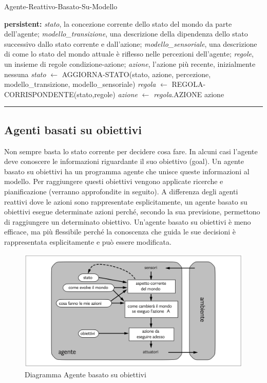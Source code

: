 \documentclass{article}
\begin{document}
\begin{center}
\begin{algorithm}
\caption{Agente-Reattivo-Basato-Su-Modello }
\textbf{persistent: }\textit{stato}, la concezione corrente dello stato del mondo da parte dell'agente;\newline
\textit{modello\_transizione}, una descrizione della dipendenza dello stato successivo dallo stato corrente e dall'azione;\newline
\textit{modello\_sensoriale}, una descrizione di come lo stato del mondo attuale è riflesso nelle percezioni dell'agente;\newline
\textit{regole}, un insieme di regole condizione-azione;\newline
\textit{azione}, l'azione più recente, inizialmente nessuna\;
\textit{stato} $\leftarrow$ AGGIORNA-STATO(stato, azione, percezione, modello\_transizione, modello\_sensoriale)\;
\textit{regola} $\leftarrow$ REGOLA-CORRISPONDENTE(stato,regole)\;
\textit{azione} $\leftarrow$ \textit{regola}.AZIONE\;
\Return azione
\end{algorithm}
\end{center}
\par\noindent\rule{\textwidth}{0.4pt}
\newpage
\subsection{Agenti basati su obiettivi}
Non sempre basta lo stato corrente per decidere cosa fare. In alcuni casi l'agente deve conoscere le informazioni riguardante il suo obiettivo (goal). Un agente basato su obiettivi ha un programma agente che unisce queste informazioni al modello. Per raggiungere questi obiettivi vengono applicate ricerche e pianificazione (verranno approfondite in seguito).
A differenza degli agenti reattivi dove le azioni sono rappresentate esplicitamente, un agente basato su obiettivi esegue determinate azioni perché, secondo la sua previsione, permettono di raggiungere un determinato obiettivo.
Un'agente basato su obiettivi è meno efficace, ma più flessibile perché la conoscenza che guida le sue decisioni è rappresentata esplicitamente e può essere modificata.
\begin{figure}[H]
    \centering
    \includegraphics[width=0.5\linewidth]{Images/AgenteBasatoObiettivi.png}
    \caption{Diagramma Agente basato su obiettivi}
    \label{fig:enter-label}
\end{figure}
\newpage
\end{document}
